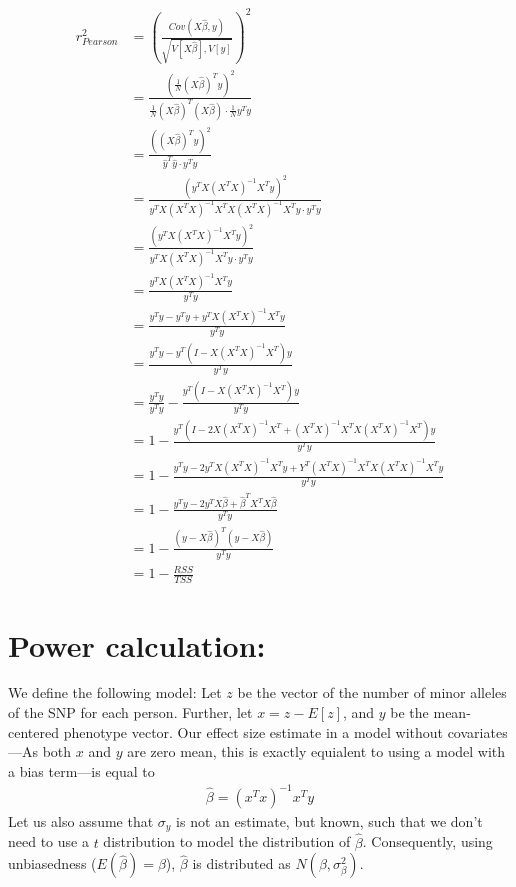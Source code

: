 \documentclass{scrartcl}
\begin{document}
\begin{align*}
r_{Pearson}^2 &= \left(\frac{Cov(X\hat\beta,y)}{\sqrt{V[X\hat\beta],V[y]}}\right)^2
\\
&=
\frac{\left(\frac{1}{N}(X\hat\beta)^Ty\right)^2}{\frac{1}{N}{(X\hat\beta)}^T (X\hat\beta) \cdot \frac{1}{N}y^T y}
\\
&=
\frac{\left((X\hat\beta)^Ty\right)^2}{{\hat y}^T \hat y \cdot y^T y}
\\
&=
\frac{\left(y^TX(X^T X)^{-1}X^Ty\right)^2}{y^TX(X^T X)^{-1}X^TX(X^T X)^{-1}X^Ty \cdot y^T y}
\\
&=
\frac{\left(y^TX(X^T X)^{-1}X^Ty\right)^2}{y^TX(X^T X)^{-1}X^Ty \cdot y^T y}
\\
&=
\frac{y^TX(X^T X)^{-1}X^Ty}{ y^T y}
\\
&=
\frac{y^Ty - y^Ty + y^TX(X^T X)^{-1}X^Ty}{ y^T y}
\\
&=
\frac{y^Ty - y^T(I - X(X^T X)^{-1}X^T)y }{ y^T y}
\\
&=
\frac{y^Ty}{y^Ty} - \frac{y^T(I - X(X^T X)^{-1}X^T)y }{ y^T y}
\\
&=
1 - \frac{y^T(I - 2 X(X^T X)^{-1}X^T + (X^T X)^{-1}X^TX(X^T X)^{-1}X^T)y }{ y^T y}
\\
&=
1 - \frac{y^Ty - 2 y^TX(X^T X)^{-1}X^Ty + Y^T(X^T X)^{-1}X^TX(X^T X)^{-1}X^Ty }{ y^T y}
\\
&=
1 - \frac{y^Ty - 2 y^TX\hat\beta + \hat\beta^T X^TX\hat\beta }{ y^T y}
\\
&=
1 - \frac{\left(y - X\hat\beta\right)^T \left(y - X\hat\beta\right)}{ y^T y}
\\
&=
1 - \frac{RSS}{ TSS}
\end{align*}

\section{\bf Power calculation:}

We define the following model:
Let $z$ be the vector of the number of minor alleles of the SNP for each person.
Further, let $x=z-E[z]$, and $y$ be the mean-centered phenotype vector.  Our effect size estimate in a model without covariates---As both $x$ and $y$ are zero mean, this is exactly equialent to using a model with a bias term---is equal to
\begin{align}
\hat\beta = (x^T x)^{-1}x^Ty
\end{align}
Let us also assume that $\sigma_y$ is not an estimate, but known, such that we don't need to use a $t$ distribution to model the distribution of $\hat\beta$.
Consequently, using unbiasedness ($E(\hat\beta) = \beta$), $\hat\beta$ is distributed as $N(\beta,\sigma_\beta^2)$.
\end{document}
